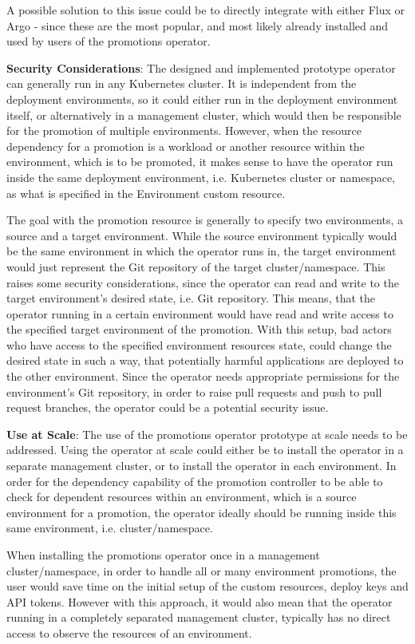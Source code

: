 A possible solution to this issue could be to directly integrate with either Flux or Argo - since these are the most popular, and most likely already installed and used by users of the promotions operator.

\textbf{Security Considerations}:
The designed and implemented prototype operator can generally run in any Kubernetes cluster.
It is independent from the deployment environments, so it could either run in the deployment environment itself,
or alternatively in a management cluster, which would then be responsible for the promotion of multiple environments.
However, when the resource dependency for a promotion is a workload or another resource within the environment,
which is to be promoted, it makes sense to have the operator run inside the same deployment environment, i.e. Kubernetes cluster or namespace, as what is specified in the Environment custom resource.

The goal with the promotion resource is generally to specify two environments,
a source and a target environment.
While the source environment typically would be the same environment in which the operator runs in,
the target environment would just represent the Git repository of the target cluster/namespace.
This raises some security considerations,
since the operator can read and write to the target environment's desired state, i.e. Git repository.
This means, that the operator running in a certain environment would have read and write access
to the specified target environment of the promotion.
With this setup, bad actors who have access to the specified environment resources state,
could change the desired state in such a way, that
potentially harmful applications are deployed to the other environment.
Since the operator needs appropriate permissions for the environment's Git repository,
in order to raise pull requests and push to pull request branches, the operator could
be a potential security issue.

\textbf{Use at Scale}:
The use of the promotions operator prototype at scale needs to be addressed.
Using the operator at scale could either be to install the operator in a separate management cluster,
or to install the operator in each environment.
In order for the dependency capability of the promotion controller
to be able to check for dependent resources within an environment,
which is a source environment for a promotion,
the operator ideally should be running inside this same environment, i.e. cluster/namespace.

When installing the promotions operator once in a management cluster/namespace,
in order to handle all or many environment promotions,
the user would save time on the initial setup of the custom resources, deploy keys and API tokens.
However with this approach, it would also mean that the operator running in a completely separated management cluster, typically has no direct access to observe the resources of an environment.

